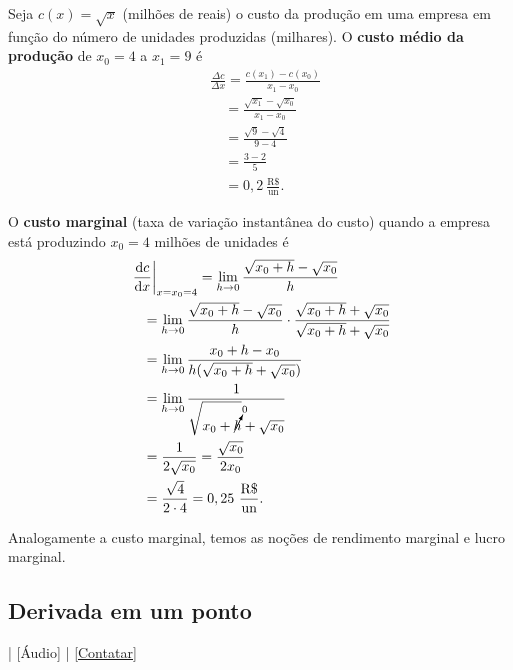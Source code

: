 \begin{ex}
  Seja $c(x) = \sqrt{x}$ (milhões de reais) o custo da produção em uma empresa em função do número de unidades produzidas (milhares). O {\bf custo médio da produção} de $x_0=4$ a $x_1=9$ é
  \begin{align}
    & \frac{\Delta c}{\Delta x} = \frac{c(x_1)-c(x_0)}{x_1-x_0}\\
    & \text{}\quad = \frac{\sqrt{x_1}-\sqrt{x_0}}{x_1-x_0}\\
    & \text{}\quad = \frac{\sqrt{9}-\sqrt{4}}{9-4}\\
    & \text{}\quad = \frac{3-2}{5} \\
    & \text{}\quad = 0,2~\frac{\text{R\$}}{\text{un}}.
  \end{align}

  O {\bf custo marginal} (taxa de variação instantânea do custo) quando a empresa está produzindo $x_0=4$ milhões de unidades é
  \begin{align}
    & \left.\frac{\mathrm{d} c}{\mathrm{d} x}\right|_{x=x_0=4} = \lim_{h\to 0} \frac{\sqrt{x_0+h}-\sqrt{x_0}}{h}\\
    & \text{}\quad = \lim_{h\to 0} \frac{\sqrt{x_0+h}-\sqrt{x_0}}{h}\cdot \frac{\sqrt{x_0+h}+\sqrt{x_0}}{\sqrt{x_0+h}+\sqrt{x_0}}\\
    & \text{}\quad = \lim_{h\to 0} \frac{x_0+h-x_0}{h(\sqrt{x_0+h}+\sqrt{x_0})}\\
    & \text{}\quad = \lim_{h\to 0} \frac{1}{\sqrt{x_0+\cancelto{0}{h}}+\sqrt{x_0}}\\
    & \text{}\quad = \frac{1}{2\sqrt{x_0}} = \frac{\sqrt{x_0}}{2x_0}\\
    & \text{}\quad = \frac{\sqrt{4}}{2\cdot 4} = 0,25~\frac{\text{R\$}}{\text{un}}.
  \end{align}
\end{ex}

\begin{obs}
  Analogamente a custo marginal, temos as noções de rendimento marginal e lucro marginal.
\end{obs}

\subsection{Derivada em um ponto}

\begin{flushright}
  [Vídeo] | [Áudio] | \href{https://phkonzen.github.io/notas/contato.html}{[Contatar]}
\end{flushright}

